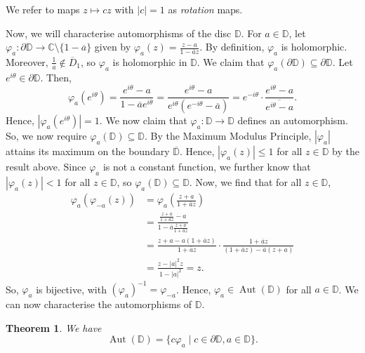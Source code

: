 \documentclass[a4paper, openany]{memoir}
\theoremstyle{definition}
\theoremstyle{plain}
\newtheorem{theorem}[definition]{Theorem}
\begin{document}
    \noindent We refer to maps $z \mapsto cz$ with $|c| = 1$ as \emph{rotation} maps. 
    
    Now, we will characterise automorphisms of the disc $\mathbb{D}$. For $a \in \mathbb{D}$, let $\varphi_a \colon \partial \mathbb{D} \to \mathbb{C} \setminus \{1 - \overline{a}\}$ given by $\varphi_a(z) = \frac{z - a}{1 - \overline{a}z}$. By definition, $\varphi_a$ is holomorphic. Moreover, $\frac{1}{\overline{a}} \not\in \overline{D}_1$, so $\varphi_a$ is holomorphic in $\mathbb{D}$. We claim that $\varphi_a(\partial \mathbb{D}) \subseteq \partial \mathbb{D}$. Let $e^{i\theta} \in \partial \mathbb{D}$. Then,
    \[\varphi_a(e^{i\theta}) = \frac{e^{i\theta} - a}{1 - \overline{a} e^{i\theta}} = \frac{e^{i\theta} - a}{e^{i\theta} (e^{-i\theta} - \overline{a})} = e^{-i\theta} \cdot \frac{e^{i\theta} - a}{\overline{e^{i\theta} - a}}.\]
    Hence, $|\varphi_a(e^{i\theta})| = 1$. We now claim that $\varphi_a \colon \mathbb{D} \to \mathbb{D}$ defines an automorphism. So, we now require $\varphi_a(\mathbb{D}) \subseteq \mathbb{D}$. By the Maximum Modulus Principle, $|\varphi_a|$ attains its maximum on the boundary $\overline{\mathbb{D}}$. Hence, $|\varphi_a(z)| \leq 1$ for all $z \in \mathbb{D}$ by the result above. Since $\varphi_a$ is not a constant function, we further know that $|\varphi_a(z)| < 1$ for all $z \in \mathbb{D}$, so $\varphi_a(\mathbb{D}) \subseteq \mathbb{D}$. Now, we find that for all $z \in \mathbb{D}$,
    \begin{align*}
        \varphi_a(\varphi_{-a}(z)) &= \varphi_a \left(\frac{z + a}{1 + \overline{a}z}\right) \\
        &= \frac{\frac{z + a}{1 + \overline{a}z} - a}{1 - \overline{a} \frac{z + a}{1 + \overline{a}z}} \\
        &= \frac{z + a - a(1 + \overline{a}z)}{1 + \overline{a}z} \cdot \frac{1 + \overline{a}z}{(1 + \overline{a}z) - \overline{a}(z+a)} \\
        &= \frac{z - |a|^2z}{1 - |a|^2} = z.
    \end{align*}
    So, $\varphi_a$ is bijective, with $(\varphi_a)^{-1} = \varphi_{-a}$. Hence, $\varphi_a \in \operatorname{Aut}(\mathbb{D})$ for all $a \in \mathbb{D}$. We can now characterise the automorphisms of $\mathbb{D}$.
    \begin{theorem}
        We have
        \[\operatorname{Aut}(\mathbb{D}) = \{c\varphi_a \mid c \in \partial \mathbb{D}, a \in \mathbb{D}\}.\]
    \end{theorem}
\end{document}
